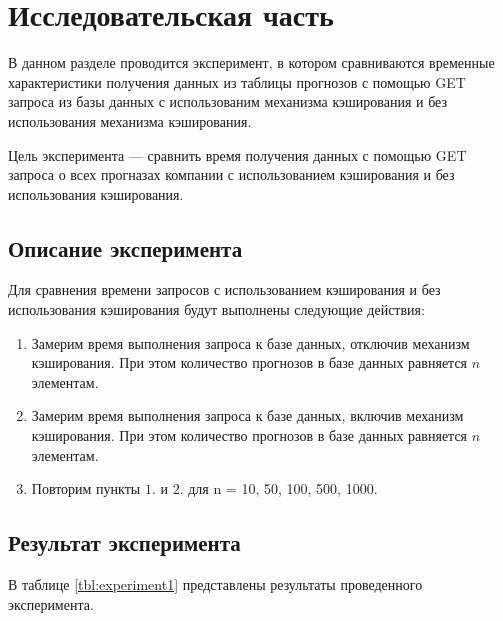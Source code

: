 \chapter{Исследовательская часть}

В данном разделе проводится эксперимент, в котором сравниваются временные характеристики получения данных из таблицы прогнозов с помощью GET запроса из базы данных с использованим механизма кэширования и без использования механизма  кэширования.

Цель эксперимента --- сравнить время получения данных с помощью GET запроса о всех прогназах компании с использованием кэширования и без использования кэширования.



\section{Описание эксперимента}
Для сравнения времени запросов с использованием кэширования и без использования кэширования будут выполнены следующие действия:
\begin{enumerate}
	\item Замерим время выполнения запроса к базе данных, отключив механизм кэширования. При этом количество прогнозов в базе данных равняется $n$ элементам.
 	\item Замерим время выполнения запроса к базе данных, включив механизм кэширования. При этом количество прогнозов в базе данных равняется $n$ элементам.
  	\item Повторим пункты $1.$ и $2.$ для n = 10, 50, 100, 500, 1000.
\end{enumerate}

\section{Результат эксперимента}

В таблице \ref{tbl:experiment1} представлены результаты проведенного эксперимента. 

\begin{table}[H]
	\centering
	\caption{Результаты сравнения времени выполнения запроса при включенном и отключенном механизме кэширования}
	\label{tbl:experiment1}
\end{table}

